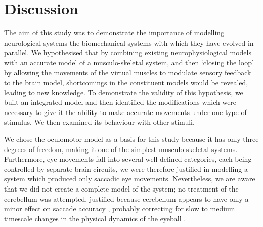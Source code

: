 \documentclass{frontiersSCNS}
\begin{document}
\section{Discussion} \label{sec:discussion}

The aim of this study was to demonstrate the importance of modelling
neurological systems  the biomechanical systems
with which they have evolved in parallel. We hypothesised that by
combining existing neurophysiological models with an accurate model of
a musculo-skeletal system, and then `closing the loop' by allowing the
movements of the virtual muscles to modulate sensory feedback to the
brain model, shortcomings in the constituent models would be revealed,
leading to new knowledge. To demonstrate the validity of this
hypothesis, we built an integrated model and then identified the
modifications which were necessary to give it the ability to make
accurate movements under one type of stimulus. We then examined its
behaviour with other stimuli.

We chose the oculomotor model as a basis for this study because it has
only three degrees of freedom, making it one of the simplest
musculo-skeletal systems. Furthermore, eye movements fall into several
well-defined categories, each being controlled by separate brain
circuits, we were therefore justified in modelling a system which
produced only saccadic eye movements. Nevertheless, we are aware that
we did not create a complete model of the system; no treatment of the
cerebellum was attempted, justified because cerebellum appears to have
only a minor effect on saccade accuracy \citep{dean_adaptive_2008},
probably correcting for slow to medium timescale changes in the
physical dynamics of the eyeball \citep{dean_learning_1994}.
\end{document}
